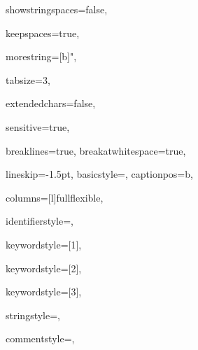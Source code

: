 {%
showstringspaces=false,

keepspaces=true,

morestring=[b]{"},

tabsize=3,

extendedchars=false,

sensitive=true,

breaklines=true,
breakatwhitespace=true,

lineskip={-1.5pt},
basicstyle={\ttfamily},
captionpos=b,

columns=[l]fullflexible,


identifierstyle={\ttfamily\color{black}},

keywordstyle=[1]{\ttfamily\color{keywordcolor}},

keywordstyle=[2]{\ttfamily\color{sortcolor}},

keywordstyle=[3]{\ttfamily\color{errorcolor}},



stringstyle={\ttfamily\color{stringcolor}},

commentstyle={\ttfamily\itshape\color{commentcolor}},

}